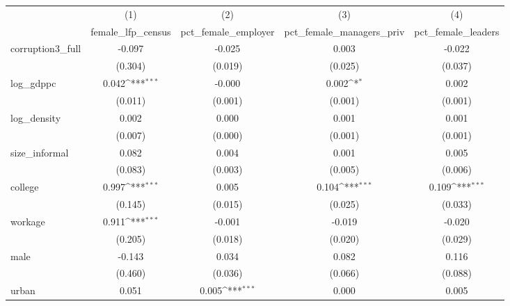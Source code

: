 {
\def\sym#1{\ifmmode^{#1}\else\(^{#1}\)\fi}
\begin{tabular}{l*{4}{c}}
\hline\hline
            &\multicolumn{1}{c}{(1)}&\multicolumn{1}{c}{(2)}&\multicolumn{1}{c}{(3)}&\multicolumn{1}{c}{(4)}\\
            &\multicolumn{1}{c}{female\_lfp\_census}&\multicolumn{1}{c}{pct\_female\_employer}&\multicolumn{1}{c}{pct\_female\_managers\_priv}&\multicolumn{1}{c}{pct\_female\_leaders}\\
\hline
corruption3\_full&      -0.097         &      -0.025         &       0.003         &      -0.022         \\
            &     (0.304)         &     (0.019)         &     (0.025)         &     (0.037)         \\
[1em]
log\_gdppc   &       0.042\sym{***}&      -0.000         &       0.002\sym{*}  &       0.002         \\
            &     (0.011)         &     (0.001)         &     (0.001)         &     (0.001)         \\
[1em]
log\_density &       0.002         &       0.000         &       0.001         &       0.001         \\
            &     (0.007)         &     (0.000)         &     (0.001)         &     (0.001)         \\
[1em]
size\_informal&       0.082         &       0.004         &       0.001         &       0.005         \\
            &     (0.083)         &     (0.003)         &     (0.005)         &     (0.006)         \\
[1em]
college     &       0.997\sym{***}&       0.005         &       0.104\sym{***}&       0.109\sym{***}\\
            &     (0.145)         &     (0.015)         &     (0.025)         &     (0.033)         \\
[1em]
workage     &       0.911\sym{***}&      -0.001         &      -0.019         &      -0.020         \\
            &     (0.205)         &     (0.018)         &     (0.020)         &     (0.029)         \\
[1em]
male        &      -0.143         &       0.034         &       0.082         &       0.116         \\
            &     (0.460)         &     (0.036)         &     (0.066)         &     (0.088)         \\
[1em]
urban       &       0.051         &       0.005\sym{***}&       0.000         &       0.005         \\

\end{tabular}}
